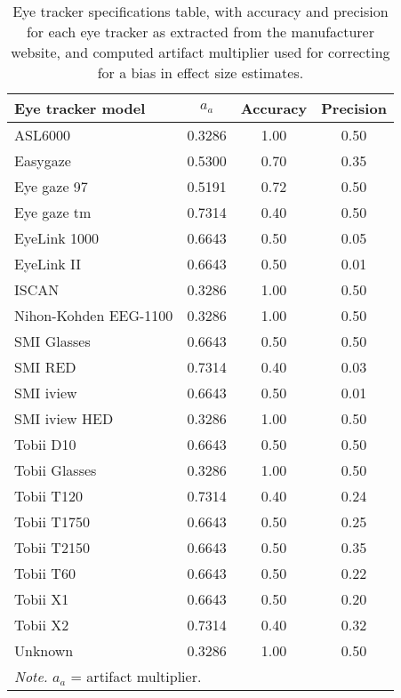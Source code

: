 \begin{table}[ht]
\centering
\caption{Eye tracker specifications table, with accuracy and precision for each eye tracker as extracted from the manufacturer website, and computed artifact multiplier used for correcting for a bias in effect size estimates.} 
\label{tab:eyetracker_specifications}
\begin{tabular}{lccc}
  \hline
Eye tracker model & $a_a$ & Accuracy & Precision \\ 
  \hline
ASL6000 & 0.3286 & 1.00 & 0.50 \\ 
  Easygaze & 0.5300 & 0.70 & 0.35 \\ 
  Eye gaze 97 & 0.5191 & 0.72 & 0.50 \\ 
  Eye gaze tm & 0.7314 & 0.40 & 0.50 \\ 
  EyeLink 1000 & 0.6643 & 0.50 & 0.05 \\ 
  EyeLink II & 0.6643 & 0.50 & 0.01 \\ 
  ISCAN & 0.3286 & 1.00 & 0.50 \\ 
  Nihon-Kohden EEG-1100 & 0.3286 & 1.00 & 0.50 \\ 
  SMI Glasses & 0.6643 & 0.50 & 0.50 \\ 
  SMI RED & 0.7314 & 0.40 & 0.03 \\ 
  SMI iview & 0.6643 & 0.50 & 0.01 \\ 
  SMI iview HED & 0.3286 & 1.00 & 0.50 \\ 
  Tobii D10 & 0.6643 & 0.50 & 0.50 \\ 
  Tobii Glasses & 0.3286 & 1.00 & 0.50 \\ 
  Tobii T120 & 0.7314 & 0.40 & 0.24 \\ 
  Tobii T1750 & 0.6643 & 0.50 & 0.25 \\ 
  Tobii T2150 & 0.6643 & 0.50 & 0.35 \\ 
  Tobii T60 & 0.6643 & 0.50 & 0.22 \\ 
  Tobii X1 & 0.6643 & 0.50 & 0.20 \\ 
  Tobii X2 & 0.7314 & 0.40 & 0.32 \\ 
  Unknown & 0.3286 & 1.00 & 0.50 \\ 
   \hline 
 \multicolumn{4}{l}{\scriptsize{\textit{Note.} $a_a$ = artifact multiplier.}} 
\end{tabular}
\end{table}
